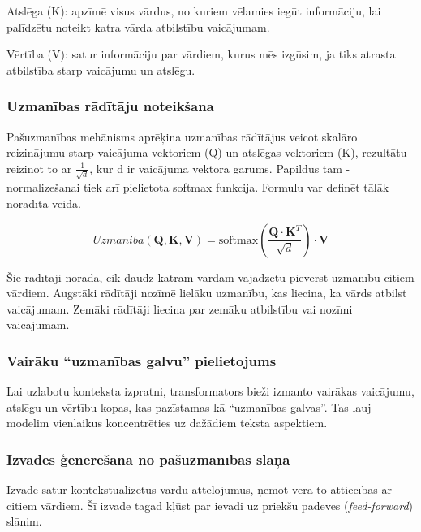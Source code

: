Atslēga (K): apzīmē visus vārdus, no kuriem vēlamies iegūt informāciju, lai palīdzētu noteikt katra vārda atbilstību vaicājumam.

Vērtība (V): satur informāciju par vārdiem, kurus mēs izgūsim, ja tiks atrasta atbilstība starp vaicājumu un atslēgu.

\subsubsection{Uzmanības rādītāju noteikšana}

Pašuzmanības mehānisms aprēķina uzmanības rādītājus veicot skalāro reizinājumu starp vaicājuma vektoriem (Q) un atslēgas vektoriem (K), rezultātu reizinot to ar \(\frac{1}{\sqrt{d}}\), kur d ir vaicājuma vektora garums. Papildus tam - normalizešanai tiek arī pielietota softmax funkcija. Formulu var definēt tālāk norādītā veidā.

\begin{equation}
Uzmaniba(\mathbf{Q}, \mathbf{K}, \mathbf{V}) = \text{softmax}\left(\frac{\mathbf{Q} \cdot \mathbf{K}^T}{\sqrt{d}}\right) \cdot \mathbf{V}
\end{equation}

Šie rādītāji norāda, cik daudz katram vārdam vajadzētu pievērst uzmanību citiem vārdiem. Augstāki rādītāji nozīmē lielāku uzmanību, kas liecina, ka vārds atbilst vaicājumam. Zemāki rādītāji liecina par zemāku atbilstību vai nozīmi vaicājumam. 

\subsubsection{Vairāku “uzmanības galvu” pielietojums}

Lai uzlabotu konteksta izpratni, transformators bieži izmanto vairākas vaicājumu, atslēgu un vērtību kopas, kas pazīstamas kā “uzmanības galvas”. Tas ļauj modelim vienlaikus koncentrēties uz dažādiem teksta aspektiem.

\subsubsection{Izvades ģenerēšana no pašuzmanības slāņa}
Izvade satur kontekstualizētus vārdu attēlojumus, ņemot vērā to attiecības ar citiem vārdiem. Šī izvade tagad kļūst par ievadi uz priekšu padeves (\textit{feed-forward}) slānim.

